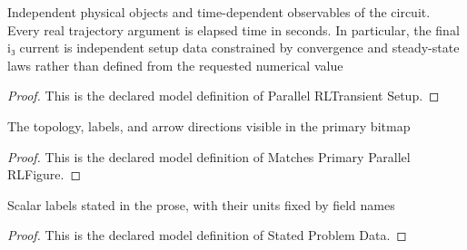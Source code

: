 \begin{definition}
  \label{def:physics:phyx-mini-0984:phyxminiproblems-problemphyxmini0984-parallelrltransientsetup}
  Independent physical objects and time-dependent observables of the circuit. Every real trajectory argument is elapsed time in seconds. In particular, the final i₃ current is independent setup data constrained by convergence and steady-state laws rather than defined from the requested numerical value
\end{definition}
\begin{proof}
  This is the declared model definition of Parallel RLTransient Setup.
\end{proof}
\begin{definition}
  \label{def:physics:phyx-mini-0984:phyxminiproblems-problemphyxmini0984-matchesprimaryparallelrlfigure}
  The topology, labels, and arrow directions visible in the primary bitmap
\end{definition}
\begin{proof}
  This is the declared model definition of Matches Primary Parallel RLFigure.
\end{proof}
\begin{definition}
  \label{def:physics:phyx-mini-0984:phyxminiproblems-problemphyxmini0984-statedproblemdata}
  Scalar labels stated in the prose, with their units fixed by field names
\end{definition}
\begin{proof}
  This is the declared model definition of Stated Problem Data.
\end{proof}
